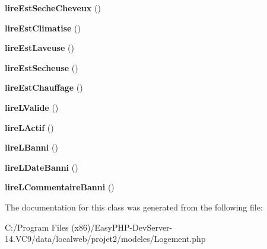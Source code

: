 \begin{DoxyCompactItemize}
\mbox{\label{class_logement_a2580aafe7c751500ab268281f983c642}} 
{\bfseries lire\+Est\+Seche\+Cheveux} ()
\item 
\mbox{\label{class_logement_af77965b98a61a2b9305ced3d93b03c0a}} 
{\bfseries lire\+Est\+Climatise} ()
\item 
\mbox{\label{class_logement_a43afe9bb8789f9a1efaa2d1d7953d930}} 
{\bfseries lire\+Est\+Laveuse} ()
\item 
\mbox{\label{class_logement_aaf69e3109df9ec9e6da24ccc60ec38d0}} 
{\bfseries lire\+Est\+Secheuse} ()
\item 
\mbox{\label{class_logement_a0999eba74cf7387b4ef3fe1efd08bf36}} 
{\bfseries lire\+Est\+Chauffage} ()
\item 
\mbox{\label{class_logement_a77ce11b474662d11410793d4a585bebe}} 
{\bfseries lire\+L\+Valide} ()
\item 
\mbox{\label{class_logement_aebd396a31bd33e859734184bee1b4ea9}} 
{\bfseries lire\+L\+Actif} ()
\item 
\mbox{\label{class_logement_a0742e9628ca0a3b1880c6c184b3a6f5d}} 
{\bfseries lire\+L\+Banni} ()
\item 
\mbox{\label{class_logement_a4f74951e93fca32904e3d838090841fa}} 
{\bfseries lire\+L\+Date\+Banni} ()
\item 
\mbox{\label{class_logement_ac945f70f5f6b7fb3b79bf9c6bd4bb5c6}} 
{\bfseries lire\+L\+Commentaire\+Banni} ()
\end{DoxyCompactItemize}


The documentation for this class was generated from the following file\+:\begin{DoxyCompactItemize}
\item 
C\+:/\+Program Files (x86)/\+Easy\+P\+H\+P-\/\+Dev\+Server-\/14.\+V\+C9/data/localweb/projet2/modeles/Logement.\+php\end{DoxyCompactItemize}
